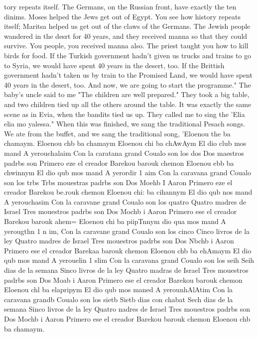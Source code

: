tory repeats itself.
The Germans, on the Russian front, have exactly the ten dinims.
Moses helped the Jews get out of Egypt.
You see how history repeats itself; Maritsa helped 
us get out of the claws of the Germans.
The Jewish people wandered in the desrt for 40 
years, and they received manna so that they could survive.
You people, you received manna 
also.
The priest taught you how to kill birds for food.
If the Turkish government hadn't 
given us trucks and trains to go to Syria, we would have spent 40 years in the desert, too.
If the Brittish government hadn't taken us by train to the Promised Land, we would have 
spent 40 years in the desert, too.
And now, we are going to start the programme."
The baby's uncle said to me "The children are well prepared."
They took a big table, 
and two children tied up all the others around the table.
It was exactly the same scene 
as in Evia, when the bandits tied us up.
They called me to sing the 'Elia elia mo yalessa."
When this was finished, we sang the traditional Pesach songs.
We ate from the buffet, 
and we sang the traditional song, 'Eloenou the ba chamaym.
Eloenou chb ba chamaym 
Eloenou chi ba chAwAym 
El dio club mos mand 
A yerouchalaim 
Con la caratana grand 
Coualo son los dos 
Dos maestros padrbs son 
Primero eze el creador 
Barekou barouk chemon 
Eloenou ebb ba chwinnym 
El dio qub mos mand 
A yerordir 1 aim 
Con la caravana grand 
Coualo son los trbs 
Trbs mouestras padrbs son 
Dos Moehb I Aaron 
Primero eze el creador 
Barekou be.rouk chemon 
Eloenou chi: ba cihannym 
El dio qub nos mand 
A yerouchasim 
Con la caravane grand 
Coualo son los quatro 
Quatro madres de Israel 
Tres mouestros padrbs son 
Dos Mochb i Aaron 
Primero ese el creador 
Barekou barouk ahem= 
Eloenou chi ba piipTnnym 
dio qua mos mand 
A yerougthn 1 n im, 
Con la caravane grand 
Coualo son los cinco 
Cinco livros de la ley 
Quatro madres de Israel 
Tres mouestros padrbs son 
Dos Nbchb i Aaron 
Primero ese el creador 
Barekaa barouk chemon 
Eloenou chb ba ehAmaym 
El dio qub mos mand 
A yerouelin 1 slim 
Con la caravana grand 
Coualo son los seih 
Seih dias de la semana 
Sinco livros de la ley 
Quatro madras de Israel 
Tres mouestros padrbs son 
Dos Moab i Aaron 
Primero ese el creador 
Barekou barouk chemon 
Eloenou chl ba elapripym 
El dio qub mos maned 
A yerounhAlAtim 
Con la caravana grandb 
Coualo son los sietb 
Sietb dias con chabat 
Sech dias de la semana 
Sinco livros de la ley 
Quatro nadres de Israel 
Tres mouestros padrbs son 
Dos Mochb i Aaron 
Primero ese el creador 
Barekou barouk chemon 
Eloenou chb ba chamaym.

